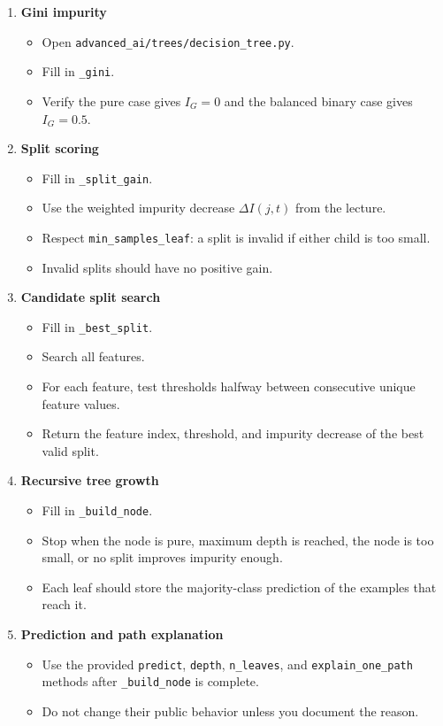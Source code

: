 \begin{enumerate}[label=\textbf{T\arabic*.}]
  \item \textbf{Gini impurity}
\begin{itemize}
  \item Open \texttt{advanced\_ai/trees/decision\_tree.py}.
  \item Fill in \texttt{\_gini}.
  \item Verify the pure case gives $I_G=0$ and the balanced binary case gives $I_G=0.5$.
\end{itemize}

  \item \textbf{Split scoring}
\begin{itemize}
  \item Fill in \texttt{\_split\_gain}.
  \item Use the weighted impurity decrease $\Delta I(j,t)$ from the lecture.
  \item Respect \texttt{min\_samples\_leaf}: a split is invalid if either child is too small.
  \item Invalid splits should have no positive gain.
\end{itemize}

  \item \textbf{Candidate split search}
\begin{itemize}
  \item Fill in \texttt{\_best\_split}.
  \item Search all features.
  \item For each feature, test thresholds halfway between consecutive unique feature values.
  \item Return the feature index, threshold, and impurity decrease of the best valid split.
\end{itemize}

  \item \textbf{Recursive tree growth}
\begin{itemize}
  \item Fill in \texttt{\_build\_node}.
  \item Stop when the node is pure, maximum depth is reached, the node is too small, or no split improves impurity enough.
  \item Each leaf should store the majority-class prediction of the examples that reach it.
\end{itemize}

  \item \textbf{Prediction and path explanation}
\begin{itemize}
  \item Use the provided \texttt{predict}, \texttt{depth}, \texttt{n\_leaves}, and \texttt{explain\_one\_path} methods after \texttt{\_build\_node} is complete.
  \item Do not change their public behavior unless you document the reason.
\end{itemize}
\end{enumerate}

